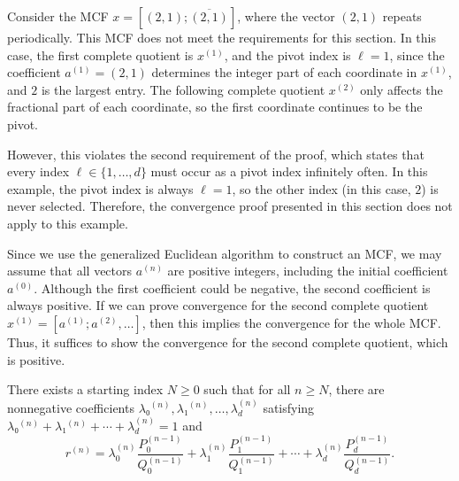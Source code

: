 \begin{example}
  Consider the MCF $x = [(2, 1); \overline{(2, 1)}]$,
  where the vector $(2, 1)$ repeats periodically.
  This MCF does not meet the requirements for this section.
  In this case, the first complete quotient is $x^{(1)}$, and the pivot index is $\ell = 1$,
  since the coefficient $a^{(1)} = (2, 1)$ determines the integer part
  of each coordinate in $x^{(1)}$, and $2$ is the largest entry.
  The following complete quotient $x^{(2)}$ only affects the fractional part
  of each coordinate, so the first coordinate continues to be the pivot.

  However, this violates the second requirement of the proof,
  which states that every index $\ell \in \{1, \dots, d\}$ must occur
  as a pivot index infinitely often.
  In this example, the pivot index is always $\ell = 1$,
  so the other index (in this case, $2$) is never selected.
  Therefore, the convergence proof presented in this section does not apply to this example.
\end{example}

Since we use the generalized Euclidean algorithm to construct an MCF,
we may assume that all vectors $a^{(n)}$ are positive integers,
including the initial coefficient $a^{(0)}$.
Although the first coefficient could be negative,
the second coefficient is always positive.
If we can prove convergence for the second complete quotient $x^{(1)} = [a^{(1)}; a^{(2)}, …]$,
then this implies the convergence for the whole MCF.
Thus, it suffices to show the convergence for the second complete quotient,
which is positive.

\begin{lemma}
  \label{lem:conv-conv}
  There exists a starting index $N ≥ 0$ such that for all $n ≥ N$,
  there are nonnegative coefficients $λ₀^{(n)}, λ₁^{(n)}, …, λ_d^{(n)}$
  satisfying $λ₀^{(n)} + λ₁^{(n)} + ⋯ + λ_d^{(n)} = 1$ and
  \[
    r^{(n)} = λ_0^{(n)} \frac{P_0^{(n-1)}}{Q_0^{(n-1)}}
            + λ_1^{(n)} \frac{P_1^{(n-1)}}{Q_1^{(n-1)}}
            + ⋯
            + λ_d^{(n)} \frac{P_d^{(n-1)}}{Q_d^{(n-1)}}.
  \]
\end{lemma}

